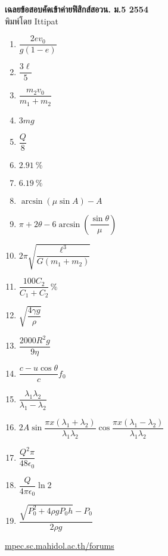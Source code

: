 \documentclass[a4paper,12pt]{article}
\begin{document}
\thispagestyle{empty}
\begin{center}
	{\huge \textbf{เฉลยข้อสอบคัดเข้าค่ายฟิสิกส์สอวน. ม.\textenglish{5} 2554}}\\
	พิมพ์โดย Ittipat\\
\end{center}
\begin{enumerate}
	\item \(\dfrac{2ev_{0}}{g(1-e)}\)
	\item \(\dfrac{3\ell}{5}\)
	\item \(\dfrac{m_{2}v_{0}}{m_{1} + m_{2}}\)
	\item \(3mg\)
	\item \(\dfrac{Q}{8}\)
	\item \(\SI{2.91}{\%}\)
	\item \(\SI{6.19}{\%}\)
	\item \(\arcsin (\mu \sin A) - A \)
	\item \(\pi +2\theta - 6\arcsin \left(\dfrac{\sin \theta}{\mu }\right)\)
	\item \(2\pi  \sqrt{\dfrac{\ell^{3}}{G(m_{1}+m_{2})}}\)
	\item \(\dfrac{100C_{2}}{C_{1}+C_{2}}\,\si{\%}\)
	\item \(\sqrt{\dfrac{4\gamma g}{\rho }}\)
	\item \(\dfrac{2000R^{2}g}{9\eta }\)
	\item \(\dfrac{c-u \cos \theta}{c}f_{0}\)
	\item \(\dfrac{\lambda _{1}\lambda _{2}}{\lambda _{1} - \lambda _{2}}\)
	\item \(2A \sin \dfrac{\pi x(\lambda _{1} + \lambda _{2})}{\lambda _{1}\lambda _{2}} \cos \dfrac{\pi x (\lambda _{1} - \lambda _{2})}{\lambda _{1}\lambda _{2}}\)
	\item \(\dfrac{Q^{2} \pi}{48\epsilon _{0}}\)
	\item \(\dfrac{Q}{4 \pi \epsilon _{0} } \ln 2\)
	\item \(\dfrac{\sqrt{P_{0}^{2} + 4 \rho gP_{0}h} - P_{0}}{2 \rho g}\)
\end{enumerate}
\vfill	
\begin{center}
	\href{http://mpec.sc.mahidol.ac.th/forums/}{mpec.sc.mahidol.ac.th/forums}
\end{center}
\end{document}
